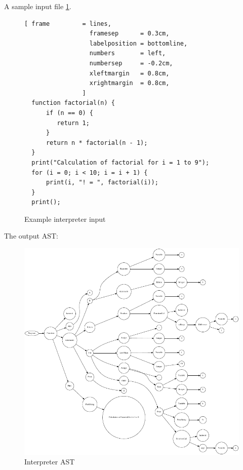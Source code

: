 A sample input file \ref{fig:example_interpreter_input}.
\begin{figure}[!ht]

\begin{Verbatim}[ frame         = lines, 
                  framesep      = 0.3cm, 
                  labelposition = bottomline,
                  numbers       = left,
                  numbersep     = -0.2cm,
                  xleftmargin   = 0.8cm,
                  xrightmargin  = 0.8cm,
                ]
  function factorial(n) {
      if (n == 0) {
         return 1;
      }
      return n * factorial(n - 1);
  }
  print("Calculation of factorial for i = 1 to 9");
  for (i = 0; i < 10; i = i + 1) {
      print(i, "! = ", factorial(i));
  }
  print();
		\end{Verbatim}
\caption{Example interpreter input}
\label{fig:example_interpreter_input}
\end{figure}
%
The output AST:
%


\begin{figure}
	\centering
		\includegraphics{interpreter_tree.pdf}
	\caption{Interpreter AST}
	\label{fig:interpreter_tree}
\end{figure}

